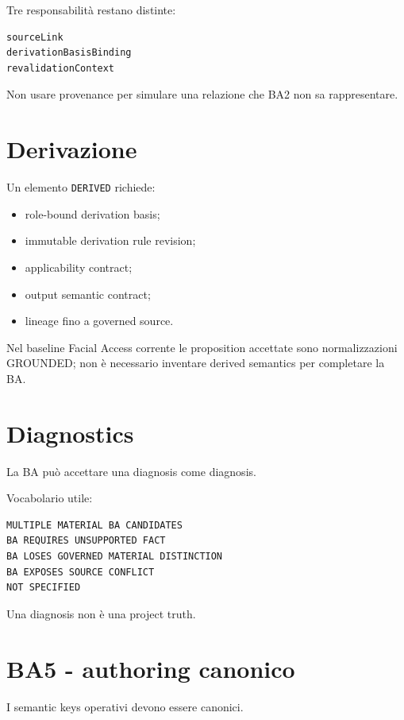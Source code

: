 \documentclass[11pt,a4paper]{article}
\newcommand{\code}[1]{\nolinkurl{#1}}
\begin{document}
Tre responsabilità restano distinte:

\begin{lstlisting}
sourceLink
derivationBasisBinding
revalidationContext
\end{lstlisting}

Non usare provenance per simulare una relazione che BA2 non sa rappresentare.

\section{Derivazione}

Un elemento \code{DERIVED} richiede:

\begin{itemize}
\item role-bound derivation basis;
\item immutable derivation rule revision;
\item applicability contract;
\item output semantic contract;
\item lineage fino a governed source.
\end{itemize}

Nel baseline Facial Access corrente le proposition accettate sono normalizzazioni GROUNDED; non è necessario inventare derived semantics per completare la BA.

\section{Diagnostics}

La BA può accettare una diagnosis come diagnosis.

Vocabolario utile:

\begin{lstlisting}
MULTIPLE MATERIAL BA CANDIDATES
BA REQUIRES UNSUPPORTED FACT
BA LOSES GOVERNED MATERIAL DISTINCTION
BA EXPOSES SOURCE CONFLICT
NOT SPECIFIED
\end{lstlisting}

\begin{closedbox}
Una diagnosis non è una project truth.
\end{closedbox}

\section{BA5 - authoring canonico}

I semantic keys operativi devono essere canonici.
\end{document}
